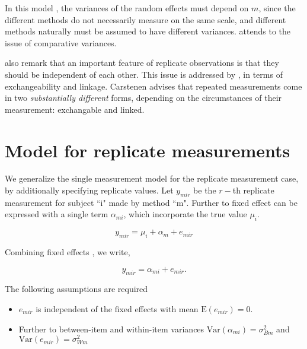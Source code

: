 \documentclass[12pt, a4paper]{report}
\theoremstyle{plain}
\theoremstyle{definition}
\theoremstyle{remark}
\begin{document}
	
	
	
	In this model , the variances of the random effects must depend on
	$m$, since the different methods do not necessarily measure on the
	same scale, and different methods naturally must be assumed to
	have different variances. \citet{BXC2004} attends to the issue of
	comparative variances.
	
	
	
	\bigskip
	\citet{BA99} also remark that an important feature of replicate observations is that they should be independent
	of each other. This issue is addressed by \citet{BXC2010}, in terms of exchangeability and linkage. Carstenen advises that repeated measurements come in two \emph{substantially different} forms, depending on the circumstances of their measurement: exchangable and linked.
	


	\section{Model for replicate measurements}
	
	We generalize the single measurement model for the replicate measurement case, by additionally specifying replicate values. Let $y_{mir}$ be the $r-$th replicate measurement for subject ``i" made by method ``m". Further to \citet{barnhart} fixed effect can be expressed with a single term $\alpha_{mi}$, which incorporate the true value $\mu_i$.
	
	\[ y_{mir} = \mu_{i} + \alpha_{m} + e_{mir}  \]
	
	Combining fixed effects \citep{barnhart}, we write,
	
	\[ y_{mir} = \alpha_{mi} + e_{mir}.\]
	
	The following assumptions are required
	
	\begin{itemize}
		\item $e_{mir}$ is independent of the fixed effects with mean $\mbox{E}(e_{mir}) = 0$.
		\item Further to \citet{barnhart} between-item and within-item variances $\mbox{Var}(\alpha_{mi}) = \sigma^2_{Bm}$ and $\mbox{Var}(e_{mir}) = \sigma^2_{Wm}$
		
	\end{itemize}
	
\end{document}
